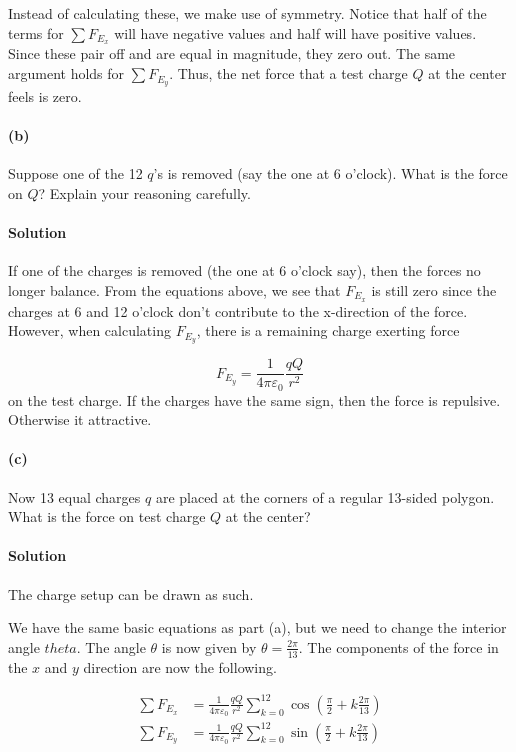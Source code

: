 \documentclass{article}
\begin{document}
Instead of calculating these, we make use of symmetry. Notice that half of the terms for $\sum F_{E_x}$ will have negative values and half will have positive values. Since these pair off and are equal in magnitude, they zero out. The same argument holds for $\sum F_{E_y}$. Thus, the net force that a test charge $Q$ at the center feels is zero. 

\paragraph{(b)} Suppose one of the 12 $q$'s is removed (say the one at 6 o'clock). What is the force on $Q$? Explain your reasoning carefully.

\paragraph{Solution} If one of the charges is removed (the one at 6 o'clock say), then the forces no longer balance. From the equations above, we see that $F_{E_x}$ is still zero since the charges at 6 and 12 o'clock don't contribute to the x-direction of the force. However, when calculating $F_{E_y}$, there is a remaining charge exerting force 

$$
F_{E_y} = \frac{1}{4\pi\varepsilon_0}\frac{qQ}{r^2}
$$
on the test charge. If the charges have the same sign, then the force is repulsive. Otherwise it attractive.

\newpage

\paragraph{(c)} Now 13 equal charges $q$ are placed at the corners of a regular 13-sided polygon. What is the force on test charge $Q$ at the center?

\paragraph{Solution} The charge setup can be drawn as such. 



We have the same basic equations as part (a), but we need to change the interior angle $theta$. The angle $\theta$ is now given by $\theta = \frac{2\pi}{13}$.  The components of the force in the $x$ and $y$ direction are now the following. 

\begin{align*}
    \sum F_{E_x} &= \frac{1}{4\pi\varepsilon_0}\frac{qQ}{r^2} \sum_{k=0}
^{12} \cos(\frac{\pi}{2} + k\frac{2\pi}{13})\\
\sum F_{E_y} &= \frac{1}{4\pi\varepsilon_0}\frac{qQ}{r^2} \sum_{k=0}
^{12} \sin(\frac{\pi}{2} + k\frac{2\pi}{13})\\
\end{align*}
\end{document}
